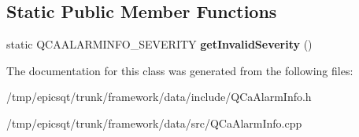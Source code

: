 \subsection*{Static Public Member Functions}
\begin{DoxyCompactItemize}
\item 
\hypertarget{classQCaAlarmInfo_a5f011c5378d7c95476d9bf94788b808c}{
static QCAALARMINFO\_\-SEVERITY {\bfseries getInvalidSeverity} ()}
\label{classQCaAlarmInfo_a5f011c5378d7c95476d9bf94788b808c}

\end{DoxyCompactItemize}


The documentation for this class was generated from the following files:\begin{DoxyCompactItemize}
\item 
/tmp/epicsqt/trunk/framework/data/include/QCaAlarmInfo.h\item 
/tmp/epicsqt/trunk/framework/data/src/QCaAlarmInfo.cpp\end{DoxyCompactItemize}
